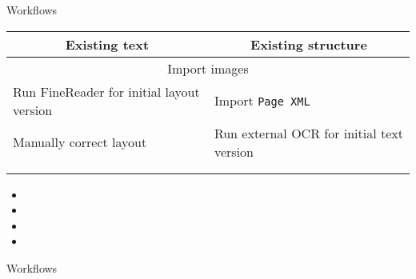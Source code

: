 \documentclass{bbawslides}
\begin{document}
\begin{bbawslide}{Workflows}
  \vspace*{2mm}%
  \centerslidestrue%
  \begin{center}
    \begin{tabular}{|l|l|}
      \hline
      \multicolumn{1}{|c|}{\textbf{Existing text}} & \multicolumn{1}{c|}{\textbf{Existing structure}} \\
      \hline
      \hline
      \multicolumn{2}{|c|}{Import images} \\
      \hline
      Run FineReader for initial layout version & Import \texttt{Page XML} \\
      \hline
      Manually correct layout & Run external OCR for initial text version \\
      \hline
      \multicolumn{2}{|c|}{\bf \phantom{Copy and paste text region by region}} \\
      \hline
      & \phantom{Manually correct text} \\
      \hline
    \end{tabular}
  \end{center}
  \begin{itemize}
    \item
    \item
    \item
    \item
  \end{itemize}
\end{bbawslide}

\begin{bbawslide}{Workflows}
  \vspace*{3mm}%
\end{bbawslide}
\end{document}
